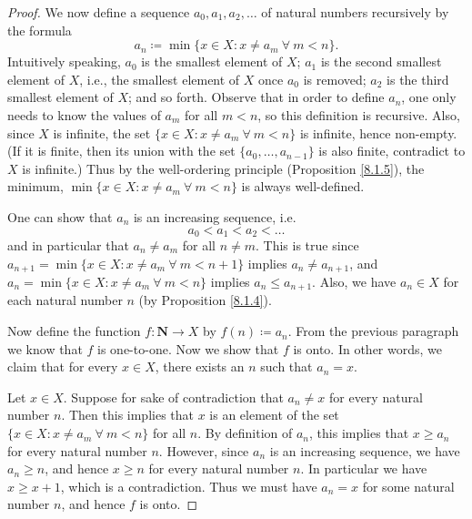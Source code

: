 \begin{proof}
    We now define a sequence \(a_0, a_1, a_2, \dots\) of natural numbers recursively by the formula
    \[
        a_n \coloneqq \min\{x \in X : x \neq a_m \ \forall\ m < n\}.
    \]
    Intuitively speaking, \(a_0\) is the smallest element of \(X\);
    \(a_1\) is the second smallest element of \(X\), i.e., the smallest element of \(X\) once \(a_0\) is removed;
    \(a_2\) is the third smallest element of \(X\);
    and so forth.
    Observe that in order to define \(a_n\), one only needs to know the values of \(a_m\) for all \(m < n\), so this definition is recursive.
    Also, since \(X\) is infinite, the set \(\{x \in X : x \neq a_m \ \forall\ m < n\}\) is infinite, hence non-empty.
    (If it is finite, then its union with the set \(\{a_0, \dots, a_{n - 1}\}\) is also finite, contradict to \(X\) is infinite.)
    Thus by the well-ordering principle (Proposition \ref{8.1.5}), the minimum, \(\min\{x \in X : x \neq a_m \ \forall\ m < n\}\) is always well-defined.

    One can show that \(a_n\) is an increasing sequence, i.e.
    \[
        a_0 < a_1 < a_2 < \dots
    \]
    and in particular that \(a_n \neq a_m\) for all \(n \neq m\).
    This is true since \(a_{n + 1} = \min\{x \in X : x \neq a_m \ \forall\ m < n + 1\}\) implies \(a_n \neq a_{n + 1}\), and \(a_n = \min\{x \in X : x \neq a_m \ \forall\ m < n\}\) implies \(a_n \leq a_{n + 1}\).
    Also, we have \(a_n \in X\) for each natural number \(n\) (by Proposition \ref{8.1.4}).

    Now define the function \(f : \mathbf{N} \to X\) by \(f(n) \coloneqq a_n\).
    From the previous paragraph we know that \(f\) is one-to-one.
    Now we show that \(f\) is onto.
    In other words, we claim that for every \(x \in X\), there exists an \(n\) such that \(a_n = x\).

    Let \(x \in X\).
    Suppose for sake of contradiction that \(a_n \neq x\) for every natural number \(n\).
    Then this implies that \(x\) is an element of the set \(\{x \in X : x \neq a_m \ \forall\ m < n\}\) for all \(n\).
    By definition of \(a_n\), this implies that \(x \geq a_n\) for every natural number \(n\).
    However, since \(a_n\) is an increasing sequence, we have \(a_n \geq n\), and hence \(x \geq n\) for every natural number \(n\).
    In particular we have \(x \geq x + 1\), which is a contradiction.
    Thus we must have \(a_n = x\) for some natural number \(n\), and hence \(f\) is onto.


\end{proof}
